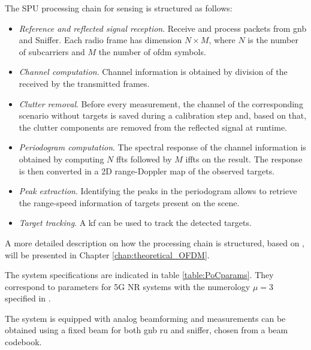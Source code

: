 The SPU processing chain for sensing is structured as follows:

\begin{itemize}
	\item \textit{Reference and reflected signal reception}. Receive and process packets from \gls{gnb} and Sniffer. Each radio frame has dimension $N\times M$, where $N$ is the number of subcarriers and $M$ the number of \gls{ofdm} symbols.
	\item \textit{Channel computation}. Channel information is obtained by division of the received by the transmitted frames.
	\item \textit{Clutter removal}. Before every measurement, the channel of the corresponding scenario without targets is saved during a calibration step and, based on that, the clutter components are removed from the reflected signal at runtime.
	\item \textit{Periodogram computation}. The spectral response of the channel information is obtained by computing $N$ \glspl{fft} followed by $M$ \glspl{ifft} on the result. The response is then converted in a 2D range-Doppler map of the observed targets. 
	\item \textit{Peak extraction}. Identifying the peaks in the periodogram allows to retrieve the range-speed information of targets present on the scene.
	\item \textit{Target tracking}. A \gls{kf} can be used to track the detected targets. 
\end{itemize} 
A more detailed description on how the processing chain is structured,  based on \cite{Braun2014OFDMRA}, will be presented in Chapter \ref{chap:theoretical_OFDM}.


The system specifications are indicated in table \ref{table:PoCparams}.
They correspond to parameters for 5G \gls{NR} systems with the numerology $\mu=3$ specified in \cite{TS138211}. 

The system is equipped with analog beamforming and measurements can be obtained using a fixed beam for both \gls{gnb} \gls{ru} and sniffer, chosen from a beam codebook.

